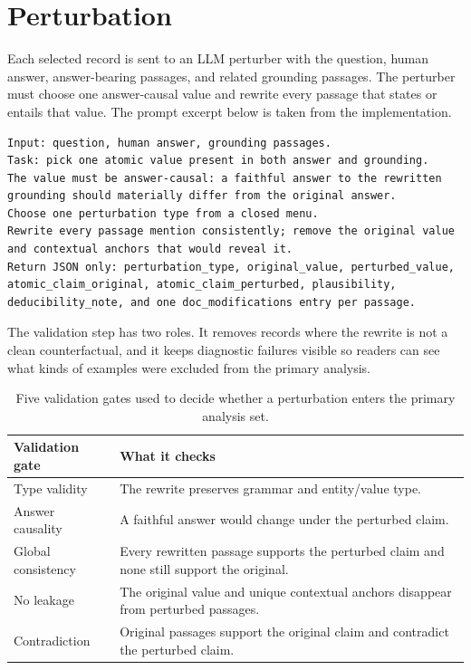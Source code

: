 \section{Perturbation}
\label{app:perturbation}

Each selected record is sent to an LLM perturber with the question, human answer, answer-bearing passages, and related grounding passages. The perturber must choose one answer-causal value and rewrite every passage that states or entails that value. The prompt excerpt below is taken from the implementation.

\begin{lstlisting}[basicstyle=\ttfamily\tiny]
Input: question, human answer, grounding passages.
Task: pick one atomic value present in both answer and grounding.
The value must be answer-causal: a faithful answer to the rewritten
grounding should materially differ from the original answer.
Choose one perturbation type from a closed menu.
Rewrite every passage mention consistently; remove the original value
and contextual anchors that would reveal it.
Return JSON only: perturbation_type, original_value, perturbed_value,
atomic_claim_original, atomic_claim_perturbed, plausibility,
deducibility_note, and one doc_modifications entry per passage.
\end{lstlisting}

The validation step has two roles. It removes records where the rewrite is not a clean counterfactual, and it keeps diagnostic failures visible so readers can see what kinds of examples were excluded from the primary analysis.

\begin{table}[H]
\centering
\scriptsize
\begin{tabularx}{\linewidth}{@{}L{1.75cm}Y@{}}
\toprule
Validation gate & What it checks \\
\midrule
Type validity & The rewrite preserves grammar and entity/value type. \\
Answer causality & A faithful answer would change under the perturbed claim. \\
Global consistency & Every rewritten passage supports the perturbed claim and none still support the original. \\
No leakage & The original value and unique contextual anchors disappear from perturbed passages. \\
Contradiction & Original passages support the original claim and contradict the perturbed claim. \\
\bottomrule
\end{tabularx}
\caption{Five validation gates used to decide whether a perturbation enters the primary analysis set.}
\label{tab:validation-gates}
\end{table}

